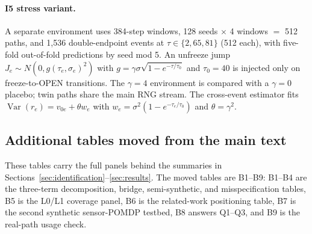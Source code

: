 \paragraph{I5 stress variant.}
A separate environment uses 384-step windows, 128 seeds $\times$ 4 windows $=$
512 paths, and 1{,}536 double-endpoint events at $\tau\in\{2,65,81\}$ (512 each),
with five-fold out-of-fold predictions by seed mod 5. An unfreeze jump
$J_e\sim N(0,g(\tau_e,\sigma_e)^2)$ with
$g=\gamma\sigma\sqrt{1-e^{-\tau/\tau_0}}$ and $\tau_0=40$ is injected only on
freeze-to-OPEN transitions. The $\gamma=4$ environment is compared with a
$\gamma=0$ placebo; twin paths share the main RNG stream. The cross-event
estimator fits $\operatorname{Var}(r_e)=v_{0e}+\theta w_e$ with
$w_e=\sigma^2(1-e^{-\tau_e/\tau_0})$ and $\theta=\gamma^2$.

\subsection{Additional tables moved from the main text}
\label{app:b-tables}

These tables carry the full panels behind the summaries in
Sections~\ref*{sec:identification}--\ref*{sec:results}. The moved tables are
B1--B9: B1--B4 are the three-term decomposition, bridge, semi-synthetic, and misspecification
tables, B5 is the L0/L1 coverage panel, B6 is the related-work positioning
table, B7 is the second synthetic sensor-POMDP testbed, B8 answers Q1--Q3, and B9 is
the real-path usage check.

\renewcommand{\thetable}{B\arabic{table}}
\renewcommand{\theHtable}{B\arabic{table}}  %
\setcounter{table}{0}









